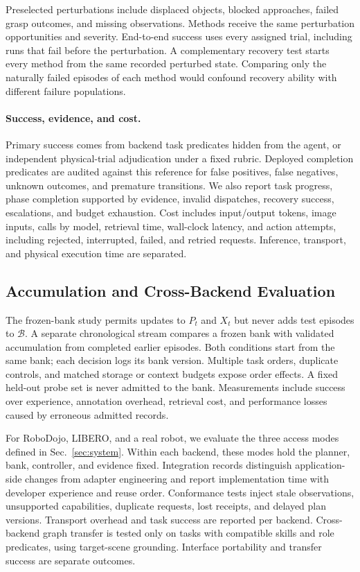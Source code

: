 Preselected perturbations include displaced objects, blocked approaches, failed grasp outcomes, and missing observations. Methods receive the same perturbation opportunities and severity. End-to-end success uses every assigned trial, including runs that fail before the perturbation. A complementary recovery test starts every method from the same recorded perturbed state. Comparing only the naturally failed episodes of each method would confound recovery ability with different failure populations.

\paragraph{Success, evidence, and cost.}
Primary success comes from backend task predicates hidden from the agent, or independent physical-trial adjudication under a fixed rubric. Deployed completion predicates are audited against this reference for false positives, false negatives, unknown outcomes, and premature transitions. We also report task progress, phase completion supported by evidence, invalid dispatches, recovery success, escalations, and budget exhaustion. Cost includes input/output tokens, image inputs, calls by model, retrieval time, wall-clock latency, and action attempts, including rejected, interrupted, failed, and retried requests. Inference, transport, and physical execution time are separated.

\subsection{Accumulation and Cross-Backend Evaluation}

The frozen-bank study permits updates to $P_t$ and $X_t$ but never adds test episodes to $\mathcal B$. A separate chronological stream compares a frozen bank with validated accumulation from completed earlier episodes. Both conditions start from the same bank; each decision logs its bank version. Multiple task orders, duplicate controls, and matched storage or context budgets expose order effects. A fixed held-out probe set is never admitted to the bank. Measurements include success over experience, annotation overhead, retrieval cost, and performance losses caused by erroneous admitted records.

For RoboDojo, LIBERO, and a real robot, we evaluate the three access modes defined in Sec.~\ref{sec:system}. Within each backend, these modes hold the planner, bank, controller, and evidence fixed. Integration records distinguish application-side changes from adapter engineering and report implementation time with developer experience and reuse order. Conformance tests inject stale observations, unsupported capabilities, duplicate requests, lost receipts, and delayed plan versions. Transport overhead and task success are reported per backend. Cross-backend graph transfer is tested only on tasks with compatible skills and role predicates, using target-scene grounding. Interface portability and transfer success are separate outcomes.

